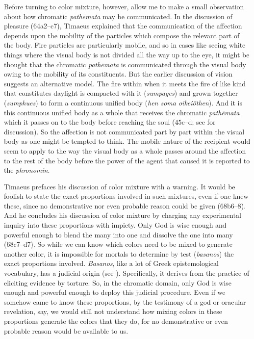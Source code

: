 Before turning to color mixture, however, allow me to make a small observation about how chromatic \emph{pathēmata} may be communicated. In the discussion of pleasure (64a2--c7), Timaeus explained that the communication of the affection depends upon the mobility of the particles which compose the relevant part of the body. Fire particles are particularly mobile, and so in cases like seeing white things where the visual body is not divided all the way up to the eye, it might be thought that the chromatic \emph{pathēmata} is communicated through the visual body owing to the mobility of its constituents. But the earlier discussion of vision suggests an alternative model. The fire within when it meets the fire of like kind that constitutes daylight is compacted with it (\emph{sumpages}) and grown together (\emph{sumphues}) to form a continuous unified body (\emph{hen soma oikeiōthen}). And it is this continuous unified body as a whole that receives the chromatic \emph{pathēmata} which it passes on to the body before reaching the soul (45c--d; see \citealt[72, 92 n46]{Hahm:1978ny} for discussion). So the affection is not communicated part by part within the visual body as one might be tempted to think. The mobile nature of the recipient would seem to apply to the way the visual body as a whole passes around the affection to the rest of the body before the power of the agent that caused it is reported to the \emph{phronomin}.

Timaeus prefaces his discussion of color mixture with a warning. It would be foolish to state the exact proportions involved in such mixtures, even if one knew these, since no demonstrative nor even probable reason could be given (68b6--8). And he concludes his discussion of color mixture by charging any experimental inquiry into these proportions with impiety. Only God is wise enough and powerful enough to blend the many into one and dissolve the one into many (68c7--d7). So while we can know which colors need to be mixed to generate another color, it is impossible for mortals to determine by test (\emph{basanos}) the exact proportions involved. \emph{Basanos}, like a lot of Greek epistemological vocabulary, has a judicial origin (see \citealt[chapter 4]{Lloyd:1979lc}). Specifically, it derives from the practice of eliciting evidence by torture. So, in the chromatic domain, only God is wise enough and powerful enough to deploy this judicial procedure. Even if we somehow came to know these proportions, by the testimony of a god or oracular revelation, say, we would still not understand how mixing colors in these proportions generate the colors that they do, for no demonstrative or even probable reason would be available to us.

